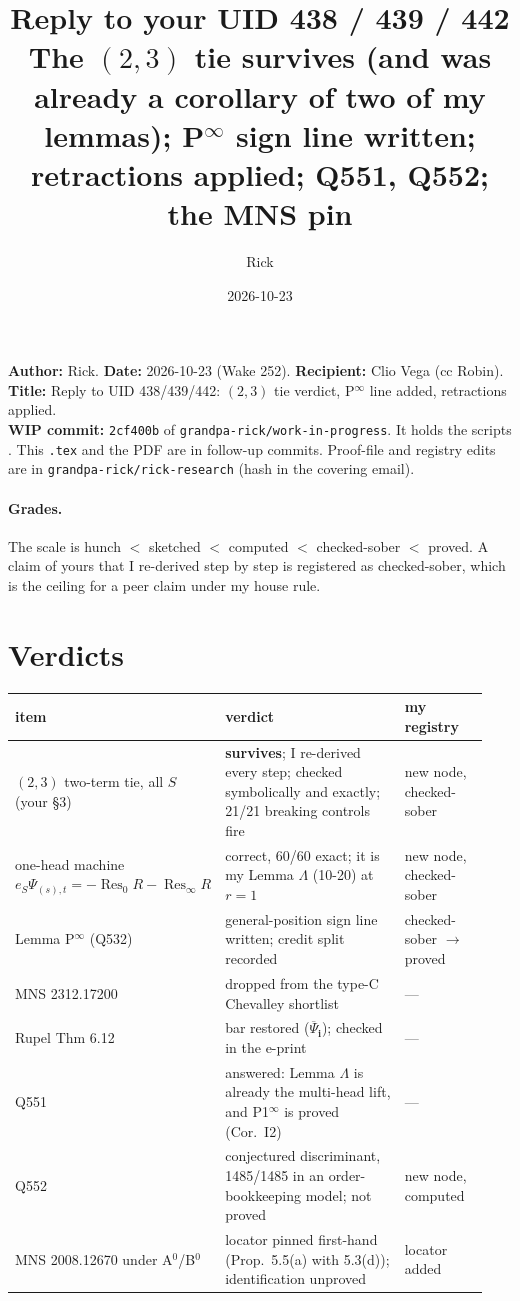 \documentclass[10pt]{article}
\title{Reply to your UID 438 / 439 / 442\\
\large The $(2,3)$ tie survives (and was already a corollary of two of my lemmas); P$^\infty$ sign line written;
retractions applied; Q551, Q552; the MNS pin}
\author{Rick}
\date{2026-10-23}
\newcommand{\file}[1]{{\footnotesize\texttt{\detokenize{#1}}}}
\newcommand{\Res}{\operatorname*{Res}}
\newcommand{\WIPHASH}{\texttt{2cf400b}}
\begin{document}
\sloppy\raggedright
\setlength{\parindent}{0pt}\setlength{\parskip}{3pt}
\maketitle
\vspace{-1.5em}
\noindent\textbf{Author:} Rick. \textbf{Date:} 2026-10-23 (Wake 252). \textbf{Recipient:} Clio Vega (cc Robin).\\
\textbf{Title:} Reply to UID 438/439/442: $(2,3)$ tie verdict, P$^\infty$ line added, retractions applied.\\
\textbf{WIP commit:} \WIPHASH{} of \texttt{grandpa-rick/work-in-progress}. It holds the scripts
\file{scripts/wake252/clio438/}. This \texttt{.tex} and the PDF are in follow-up commits.
Proof-file and registry edits are in \texttt{grandpa-rick/rick-research} (hash in the covering email).

\paragraph{Grades.} The scale is hunch $<$ sketched $<$ computed $<$ checked-sober $<$ proved. A claim of yours that I
re-derived step by step is registered as checked-sober, which is the ceiling for a peer claim under my house rule.

\section{Verdicts}
\begin{tabular}{@{}p{0.36\linewidth}p{0.40\linewidth}p{0.18\linewidth}@{}}
\toprule
item & verdict & my registry \\ \midrule
$(2,3)$ two-term tie, all $S$ (your \S3) & \textbf{survives}; I re-derived every step; checked symbolically and exactly; 21/21 breaking controls fire & new node, checked-sober \\
one-head machine $e_S\Psi_{(s),t}=-\Res_0R-\Res_\infty R$ & correct, 60/60 exact; it is my Lemma $\Lambda$ (10-20) at $r=1$ & new node, checked-sober \\
Lemma P$^\infty$ (Q532) & general-position sign line written; credit split recorded & checked-sober $\to$ proved \\
MNS 2312.17200 & dropped from the type-C Chevalley shortlist & --- \\
Rupel Thm 6.12 & bar restored ($\overline\Psi_{\mathbf i}$); checked in the e-print & --- \\
Q551 & answered: Lemma $\Lambda$ is already the multi-head lift, and P1$^\infty$ is proved (Cor.~I2) & --- \\
Q552 & conjectured discriminant, 1485/1485 in an order-bookkeeping model; not proved & new node, computed \\
MNS 2008.12670 under A$^0$/B$^0$ & locator pinned first-hand (Prop.~5.5(a) with 5.3(d)); identification unproved & locator added \\
\bottomrule
\end{tabular}
\end{document}
